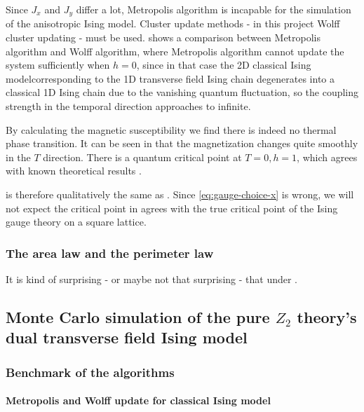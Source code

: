 \documentclass[hyperref, a4paper]{article}
\newcommand*{\Ztwo}{\texorpdfstring{$\mathbb{Z}_2$ }{Z2 }}
\newcommand*{\cim}{classical Ising model}
\def\mathbb#1{#1}%
\begin{document}
Since $J_x$ and $J_y$ differ a lot, Metropolis algorithm is incapable for the simulation of the anisotropic Ising model.
Cluster update methods - in this project Wolff cluster updating \cite{Wolff_1989} - must be used.
 shows a comparison between Metropolis algorithm and Wolff algorithm, 
where Metropolis algorithm cannot update the system sufficiently when $h=0$, 
since in that case the 2D \cim corresponding to the 1D transverse field Ising chain degenerates into a classical 1D Ising chain due to the vanishing quantum fluctuation, 
so the coupling strength in the temporal direction approaches to infinite.

By calculating the magnetic susceptibility we find there is indeed no thermal phase transition.
It can be seen in  that the magnetization changes quite smoothly in the $T$ direction.
There is a quantum critical point at $T = 0, h = 1$, which agrees with known theoretical results \cite{sachdev_2011}.

 is therefore qualitatively the same as .
Since \eqref{eq:gauge-choice-x} is wrong, we will not expect the critical point in  agrees with the true critical point of the Ising gauge theory on a square lattice.

\subsubsection{The area law and the perimeter law}

It is kind of surprising - or maybe not that surprising - that under . %

\subsection{Monte Carlo simulation of the pure \Ztwo theory's dual transverse field Ising model}

\subsubsection{Benchmark of the algorithms}

\paragraph{Metropolis and Wolff update for \cim}
\end{document}
